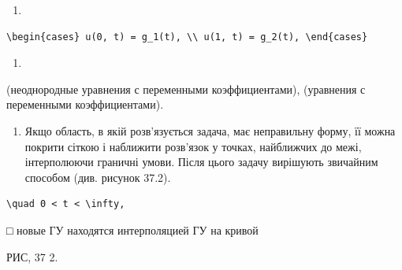 \documentclass[
  ukrainian,
]{article}
\providecommand{\tightlist}{%
  \setlength{\itemsep}{0pt}\setlength{\parskip}{0pt}}
\begin{document}
\begin{enumerate}
\def\labelenumi{\arabic{enumi})}
\setcounter{enumi}{5}
\tightlist
\item
\end{enumerate}

\begin{verbatim}
\begin{cases} u(0, t) = g_1(t), \\ u(1, t) = g_2(t), \end{cases}
\end{verbatim}

\begin{enumerate}
\def\labelenumi{\Alph{enumi})}
\setcounter{enumi}{1}
\tightlist
\item
\end{enumerate}

(неоднородные уравнения с переменными коэффициентами), (уравнения с
переменными коэффициентами).

\begin{enumerate}
\def\labelenumi{\arabic{enumi}.}
\setcounter{enumi}{5}
\tightlist
\item
  Якщо область, в якій розв'язується задача, має неправильну форму, її
  можна покрити сіткою і наближити розв'язок у точках, найближчих до
  межі, інтерполюючи граничні умови. Після цього задачу вирішують
  звичайним способом (див. рисунок 37.2).
\end{enumerate}

\begin{verbatim}
\quad 0 < t < \infty,
\end{verbatim}

□ новые ГУ находятся интерполяцией ГУ на кривой

РИС, 37 2.
\end{document}
